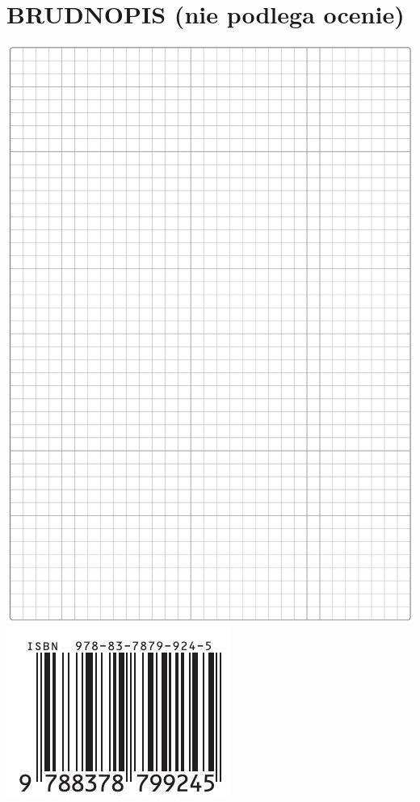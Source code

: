 \documentclass[10pt]{article}
\begin{document}
\section*{BRUDNOPIS (nie podlega ocenie)}
\includegraphics[max width=\textwidth, center]{2024_11_21_e15da647cf0a41077ac3g-15}\\
\includegraphics[max width=\textwidth, center]{2024_11_21_e15da647cf0a41077ac3g-16}
\end{document}
